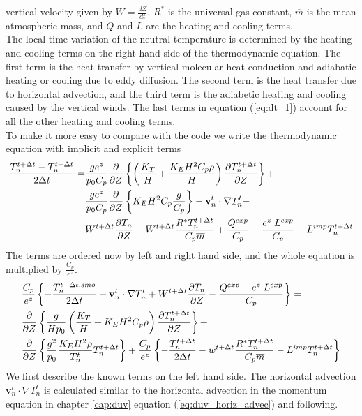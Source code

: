vertical velocity given by $W = \frac{dZ}{dt}$, $R^*$ is the
universal gas constant, $\overline{m}$ is the mean atmospheric mass,
and $Q$
and $L$ are the heating and cooling terms. \\
%
The local time variation of the neutral temperature is determined by
the heating and cooling terms on the right hand side of the
thermodynamic equation. The first term is the heat transfer by
vertical molecular heat conduction and adiabatic heating or cooling
due to eddy diffusion. The second term is the heat transfer due to
horizontal advection, and the third term is the adiabetic heating
and cooling caused by the vertical winds. The last terms in equation 
(\ref{eq:dt_1}) account
for all the other heating and cooling terms. \\

%
To make it more easy to compare with the code we write the
thermodynamic equation with implicit and explicit terms
%
\begin{align}
  \frac{T_n^{t+\Delta t}- T_n^{t- \Delta t}}{2 \Delta t} =&
   \frac{g e^z}{p_0 C_p}\frac{\partial}{\partial Z}
  \left\{ \left( \frac{K_T}{H} + \frac{K_E H^2 C_p \rho}{H} \right)
  \frac{\partial T_n^{t+\Delta t}}{\partial Z}\right\} + \notag \\
  {}& \frac{g e^z}{p_0 C_p}\frac{\partial}{\partial Z}
  \left\{K_E H^2 C_p
   \frac{g}{C_p}\right\} - \mathbf{v}_n^t\cdot \nabla T_n^t - \\
   {}& W^{t+\Delta t}\frac{\partial T_n}{\partial Z}
    - W^{t+\Delta t}\frac{R^* T_n^{t+\Delta t}}{C_p \overline{m}}
    + \frac{Q^{exp}}{C_p}- \frac{e^z \; L^{exp}}{C_p}- L^{imp} T_n^{t + \Delta t}
    \notag
\end{align}
%
The terms are ordered now by left and right hand side, and the whole
equation is multiplied by $\frac{C_p}{e^z}$.
%
\begin{align}
  & \frac{C_p}{e^z} \left\{ -\frac{T_n^{t- \Delta t,smo}}{2 \Delta t} +
  \mathbf{v}_n^t\cdot \nabla T_n^t + W^{t+\Delta t}\frac{\partial T_n}{\partial Z}
  - \frac{Q^{exp}-e^z \; L^{exp}}{C_p} \right\} = \notag \\
  & \frac{\partial}{\partial Z} \left\{
  \frac{g}{H p_0} \left( \frac{K_T}{H} + K_E H^2 C_p \rho \right)
  \frac{\partial T_n^{t+\Delta t}}{\partial Z}
  \right\} + \\
  & \frac{\partial}{\partial Z} \left\{ \frac{g^2}{p_0}\frac{K_E H^2 \rho}
  {T_n^t} T_n^{t+\Delta t} \right\}
  + \frac{C_p}{e^z}\left\{ - \frac{T_n^{t+ \Delta t}}{2 \Delta t} - w^{t+\Delta t}
  \frac{R^* T_n^{t+\Delta t}}{C_p \overline{m}} - L^{imp} T_n^{t + \Delta t}
\right\} \notag
\end{align}
%
We first describe the known terms on the left hand side. The
horizontal advection $\mathbf{v}_n^t\cdot \nabla T_n^t$ is
calculated similar to the horizontal advection in the momentum
equation in chapter \ref{cap:duv} equation
(\ref{eq:duv_horiz_advec})
and following. \\

